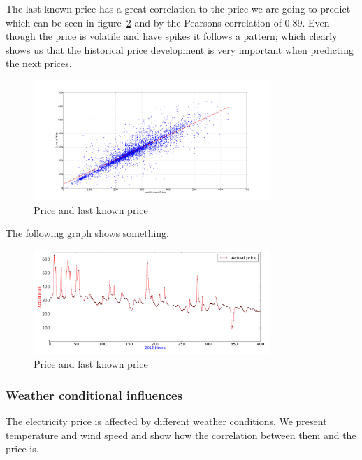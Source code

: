 The last known price has a great correlation to the price we are going to predict which can be seen in figure~\ref{fig:price_price} and by the Pearsons correlation of 0.89. Even though the price is volatile and have spikes it follows a pattern; which clearly shows us that the historical price development is very important when predicting the next prices.

\begin{figure}[H]
\centering
\includegraphics[width=0.8\textwidth]{billeder/priceVsLastKnownPrice.png}
\caption{Price and last known price}
\label{fig:price_price}
\end{figure}
The following graph shows something.
\begin{figure}[H]
\centering
\includegraphics[width=0.8\textwidth]{billeder/priceGraph400.png}
\caption{Price and last known price}
\label{fig:price_price}
\end{figure}

\subsubsection{Weather conditional influences}
\label{sec:priceWeatherInfluence}
The electricity price is affected by different weather conditions. We present temperature and wind speed and show how the correlation between them and the price is.

